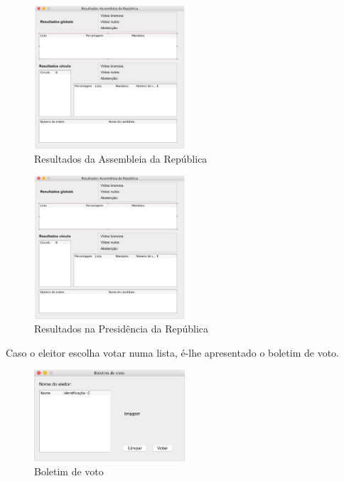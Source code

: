 \documentclass[a4paper,12pt]{report}
\begin{document}
\begin{figure}[H]
\begin{center}
	\includegraphics[width=0.5\textwidth]{media/img_interface/img5.jpg}
	 \caption{Resultados da Assembleia da República}
\end{center}
\end{figure}
\begin{figure}[H]
\begin{center}
	\includegraphics[width=0.5\textwidth]{media/img_interface/img5.jpg}
	 \caption{Resultados na Presidência da República}
\end{center}
\end{figure}
Caso o eleitor escolha votar numa lista, é-lhe apresentado o boletim de voto.
\begin{figure}[H]
\begin{center}
	\includegraphics[width=0.5\textwidth]{media/img_interface/img4boletim.jpg}
	 \caption{Boletim de voto}
\end{center}
\end{figure}
\end{document}
